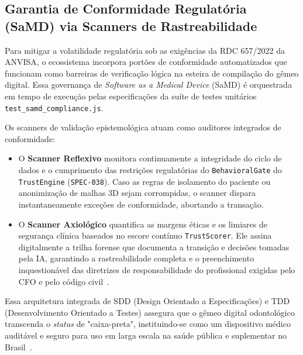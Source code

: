 \subsection{Garantia de Conformidade Regulatória (SaMD) via Scanners de Rastreabilidade}

Para mitigar a volatilidade regulatória sob as exigências da RDC 657/2022 da ANVISA, o ecossistema incorpora portões de conformidade automatizados que funcionam como barreiras de verificação lógica na esteira de compilação do gêmeo digital. Essa governança de \textit{Software as a Medical Device} (SaMD) é orquestrada em tempo de execução pelas especificações da suíte de testes unitários \texttt{test\_samd\_compliance.js}.

Os scanners de validação epistemológica atuam como auditores integrados de conformidade:
\begin{itemize}
    \item O \textbf{Scanner Reflexivo} monitora continuamente a integridade do ciclo de dados e o cumprimento das restrições regulatórias do \texttt{BehavioralGate} do \texttt{TrustEngine} (\texttt{SPEC-038}). Caso as regras de isolamento do paciente ou anonimização de malhas 3D sejam corrompidas, o scanner dispara instantaneamente exceções de conformidade, abortando a transação.
    \item O \textbf{Scanner Axiológico} quantifica as margens éticas e os limiares de segurança clínica baseados no escore contínuo \texttt{TrustScorer}. Ele assina digitalmente a trilha forense que documenta a transição e decisões tomadas pela IA, garantindo a rastreabilidade completa e o preenchimento inquestionável das diretrizes de responsabilidade do profissional exigidas pelo CFO e pelo código civil~\cite{springer2026realising}.
\end{itemize}
Essa arquitetura integrada de SDD (Design Orientado a Especificações) e TDD (Desenvolvimento Orientado a Testes) assegura que o gêmeo digital odontológico transcenda o \textit{status} de "caixa-preta", instituindo-se como um dispositivo médico auditável e seguro para uso em larga escala na saúde pública e suplementar no Brasil~\cite{abinc2026brasil}.
